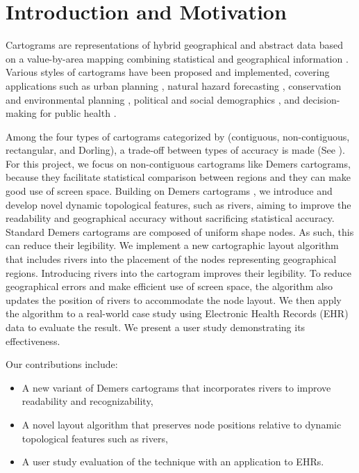 \section{Introduction and Motivation}

Cartograms are representations of hybrid geographical and abstract data based on a value-by-area mapping combining statistical and geographical information \cite{dent2009Cartography}. Various styles of cartograms have been proposed and implemented, covering applications such as urban planning \cite{harris2018Mapping, arranz-lopez2021Enduser}, natural hazard forecasting \cite{pappenberger2019Cartograms, park2020Flood}, conservation and environmental planning \cite{galluzzi2018Mapping, rocchini2019Cartogramming}, political and social demographics \cite{breitzman2018Using, alieva2021How}, and decision-making for public health \cite{gao2020Visualising, sack2021Visualizing}.

Among the four types of cartograms categorized by  (contiguous, non-contiguous, rectangular, and Dorling), a trade-off between types of accuracy is made (See ). For this project, we focus on non-contiguous cartograms like Demers cartograms, because they facilitate statistical comparison between regions and they can make good use of screen space. Building on Demers cartograms \cite{ian2002Cartogram}, we introduce and develop novel dynamic topological features, such as rivers, aiming to improve the readability and geographical accuracy without sacrificing statistical accuracy. Standard Demers cartograms are composed of uniform shape nodes. As such, this can reduce their legibility. We implement a new cartographic layout algorithm that includes rivers into the placement of the nodes representing geographical regions. Introducing rivers into the cartogram improves their legibility. To reduce geographical errors and make efficient use of screen space, the algorithm also updates the position of rivers to accommodate the node layout. We then apply the algorithm to a real-world case study using Electronic Health Records (EHR) data to evaluate the result. We present a user study demonstrating its effectiveness.

Our contributions include:

\begin{itemize}
    \item A new variant of Demers cartograms that incorporates rivers to improve readability and recognizability,
    \item A novel layout algorithm that preserves node positions relative to dynamic topological features such as rivers,
    \item A user study evaluation of the technique with an application to EHRs.
\end{itemize}

